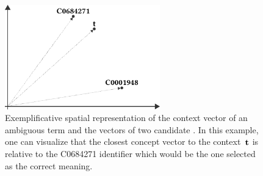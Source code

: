 \begin{figure}[!tb]
\begin{center}
\includegraphics[width=0.6\textwidth]{img/context-vector-spatial-representation/v5/img.pdf}
\caption[Exemplificative spatial representation of the context vector of an ambiguous term.]{Exemplificative spatial representation of the context vector of an ambiguous term and the vectors of two candidate . In this example, one can visualize that the closest concept vector to the context~$\mathbf{t}$ is relative to the C0684271 identifier which would be the one selected as the correct meaning.}
\label{fig:context-vector-spatial-representation}
\end{center}
\end{figure}
